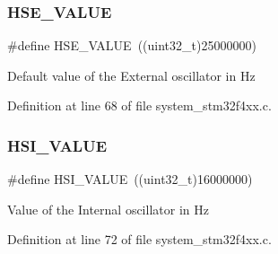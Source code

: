\subsubsection{\texorpdfstring{HSE\_VALUE}{HSE\_VALUE}}
{\footnotesize\ttfamily \#define H\+S\+E\+\_\+\+V\+A\+L\+UE~((uint32\+\_\+t)25000000)}

Default value of the External oscillator in Hz 

Definition at line 68 of file system\+\_\+stm32f4xx.\+c.

\mbox{\label{group___s_t_m32_f4xx___system___private___includes_gaaa8c76e274d0f6dd2cefb5d0b17fbc37}} 
\subsubsection{\texorpdfstring{HSI\_VALUE}{HSI\_VALUE}}
{\footnotesize\ttfamily \#define H\+S\+I\+\_\+\+V\+A\+L\+UE~((uint32\+\_\+t)16000000)}

Value of the Internal oscillator in Hz 

Definition at line 72 of file system\+\_\+stm32f4xx.\+c.

